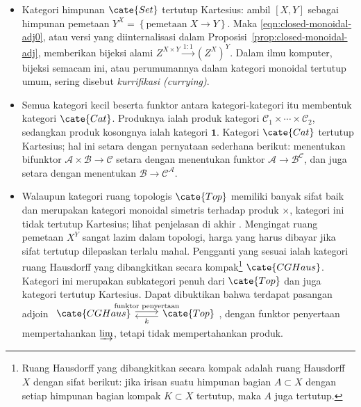 \begin{itemize}
	\item Kategori himpunan $\cate{Set}$ tertutup Kartesius: ambil $[X,Y]$
	sebagai himpunan pemetaan
	$Y^X=\left\{\text{pemetaan}\;X\to Y\right\}$. Maka
	\eqref{eqn:closed-monoidal-adj0}, atau versi yang diinternalisasi dalam
	Proposisi~\ref{prop:closed-monoidal-adj}, memberikan bijeksi alami
	$Z^{X\times Y}\xrightarrow{1:1}(Z^X)^Y$. Dalam ilmu komputer, bijeksi
	semacam ini, atau perumumannya dalam kategori monoidal tertutup umum,
	sering disebut \emph{kurrifikasi (currying)}.

	\item Semua kategori kecil beserta funktor antara kategori-kategori itu membentuk kategori
	$\cate{Cat}$. Produknya ialah produk kategori
	$\mathcal{C}_1\times\cdots\times\mathcal{C}_2$, sedangkan produk kosongnya
	ialah kategori $\mathbf{1}$. Kategori $\cate{Cat}$ tertutup Kartesius;
	hal ini setara dengan pernyataan sederhana berikut: menentukan bifunktor
	$\mathcal{A}\times\mathcal{B}\to\mathcal{C}$ setara dengan menentukan
	funktor $\mathcal{A}\to\mathcal{B}^{\mathcal{C}}$, dan juga setara dengan
	menentukan $\mathcal{B}\to\mathcal{C}^{\mathcal{A}}$.

	\item Walaupun kategori ruang topologis $\cate{Top}$ memiliki banyak sifat
	baik dan merupakan kategori monoidal simetris terhadap produk $\times$,
	kategori ini tidak tertutup Kartesius; lihat penjelasan di akhir
	\cite[\S 1.5]{Kel05}. Mengingat ruang pemetaan $X^Y$ sangat lazim dalam
	topologi, harga yang harus dibayar jika sifat tertutup dilepaskan terlalu
	mahal. Pengganti yang sesuai ialah kategori ruang Hausdorff yang dibangkitkan
	secara kompak\footnote{Ruang Hausdorff yang dibangkitkan secara kompak
	adalah ruang Hausdorff $X$ dengan sifat berikut: jika irisan suatu himpunan
	bagian $A\subset X$ dengan setiap himpunan bagian kompak $K\subset X$
	tertutup, maka $A$ juga tertutup.} $\cate{CGHaus}$. Kategori ini merupakan
	subkategori penuh dari $\cate{Top}$ dan juga kategori tertutup Kartesius.
	Dapat dibuktikan bahwa terdapat pasangan adjoin
	$\begin{tikzcd}
		\cate{CGHaus} \arrow[shift left, r, "\text{funktor penyertaan}"] & \cate{Top} \arrow[shift left, l, "k"]
	\end{tikzcd}$,
	dengan funktor penyertaan mempertahankan $\varinjlim$, tetapi tidak
	mempertahankan produk.


\end{itemize}

